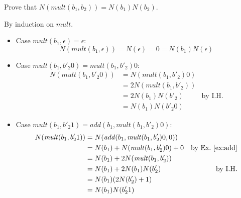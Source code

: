 \documentclass{tufte-handout}
\begin{document}
\begin{Exercise}
\label{ex:mult}
Prove that $N(\mathit{mult}(b_1,b_2)) = N(b_1) N(b_2)$.
\end{Exercise}
\begin{Answer}
By induction on $\mathit{mult}$.
\begin{itemize}
\item Case $\mathit{mult}(b_1,\epsilon) = \epsilon$:\\
  \[
  N(\mathit{mult}(b_1,\epsilon)) = N(\epsilon) = 0 
  = N(b_1) N(\epsilon)
  \]

\item Case $\mathit{mult}(b_1, b'_2 0) = \mathit{mult}(b_1,b'_2) 0$:
  \begin{align*}
    N(\mathit{mult}(b_1, b'_2 0)) &= N(\mathit{mult}(b_1,b'_2) 0) \\
     & = 2 N(\mathit{mult}(b_1,b'_2)) \\
     & = 2 N(b_1) N(b'_2) & \text{by I.H.}\\
     & = N(b_1) N (b'_2 0)
  \end{align*}

\item Case $\mathit{mult}(b_1, b'_2 1) = 
  \mathit{add}(b_1, \mathit{mult}(b_1,b'_2)0)$:
  \begin{align*}
    N(\mathit{mult}(b_1, b'_2 1)) &= 
    N(\mathit{add}(b_1, \mathit{mult}(b_1,b'_2)0, 0)) \\
    &= N(b_1) + N(\mathit{mult}(b_1,b'_2)0) + 0 & \text{by Ex.~\ref{ex:add}}\\
    &= N(b_1) + 2 N(\mathit{mult}(b_1,b'_2)) \\
    &= N(b_1) + 2 N(b_1) N(b'_2) & \text{by I.H.}\\
    &= N(b_1) (2 N(b'_2) + 1) \\
    &= N(b_1) N(b'_2 1)
  \end{align*}
\end{itemize}
\end{Answer}
\end{document}
